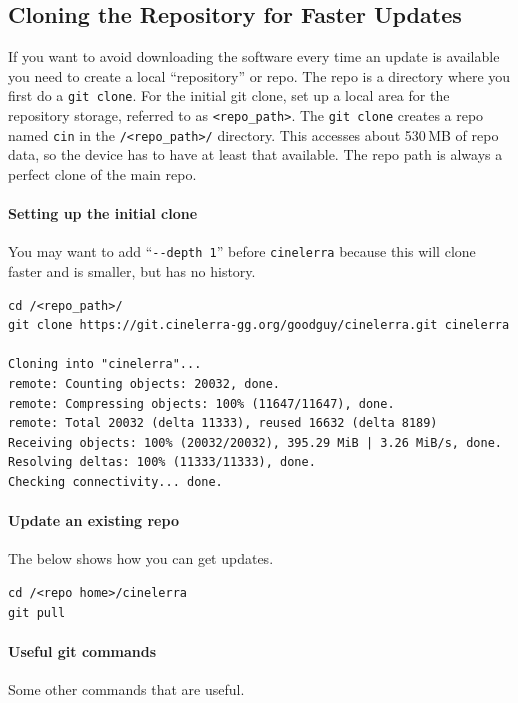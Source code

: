 \subsection{Cloning the Repository for Faster Updates}%
\label{sub:cloning_the_repository_for_faster_updates}

If you want to avoid downloading the software every time an update
is available you need to create a local ``repository'' or repo.  The
repo is a directory where you first do a \texttt{git clone}.  For
the initial git clone, set up a local area for the repository
storage, referred to as \texttt{<repo\_path>}.  The \texttt{git
  clone} creates a repo named \texttt{cin} in the
\texttt{/<repo\_path>/} directory.  This accesses about 530\,MB of
repo data, so the device has to have at least that available.  The
repo path is always a perfect clone of the main repo.

\paragraph{Setting up the initial clone}%
\label{par:setting_up_the_initial_clone}

You may want to add ``\verb|--depth 1|'' before \texttt{cinelerra}
because this will clone faster and is smaller, but has no history.

\begin{lstlisting}[style=sh]
cd /<repo_path>/
git clone https://git.cinelerra-gg.org/goodguy/cinelerra.git cinelerra

Cloning into "cinelerra"...
remote: Counting objects: 20032, done.
remote: Compressing objects: 100% (11647/11647), done.
remote: Total 20032 (delta 11333), reused 16632 (delta 8189)
Receiving objects: 100% (20032/20032), 395.29 MiB | 3.26 MiB/s, done.
Resolving deltas: 100% (11333/11333), done.
Checking connectivity... done.
\end{lstlisting}


\paragraph{Update an existing repo}%
\label{par:update_an_existing_repo}
The below shows how you can get updates.

\begin{lstlisting}[style=sh]
cd /<repo home>/cinelerra
git pull
\end{lstlisting}


\paragraph{Useful git commands}%
\label{par:useful_git_commands}
Some other commands that are useful.

